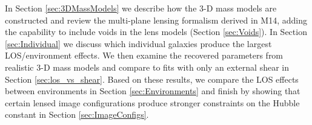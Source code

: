 In Section \ref{sec:3DMassModels} we describe how the 3-D mass models are constructed and review the multi-plane lensing formalism derived in M14, adding the capability to include voids in the lens models (Section \ref{sec:Voids}). In Section \ref{sec:Individual} we discuss which individual galaxies produce the largest LOS/environment effects. We then examine the recovered parameters from realistic 3-D mass models and compare to fits with only an external shear in Section \ref{sec:los_vs_shear}. Based on these results, we compare the LOS effects between environments in Section \ref{sec:Environments} and finish by showing that certain lensed image configurations produce stronger constraints on the Hubble constant in Section \ref{sec:ImageConfigs}.